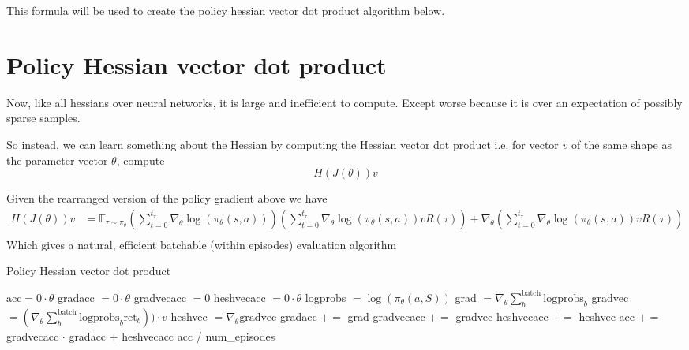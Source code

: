 \documentclass{article}
\theoremstyle{plain}
\theoremstyle{definition}
\theoremstyle{remark}
\begin{document}
	This formula will be used to create the policy hessian vector dot product algorithm below.
	
	\section{Policy Hessian vector dot product}
	Now, like all hessians over neural networks, it is large and inefficient to compute. Except worse because it is over an expectation of possibly sparse samples.
	
	So instead, we can learn something about the Hessian by computing the Hessian vector dot product i.e. for vector $v$ of the same shape as the parameter vector $\theta$, compute
	$$H(J(\theta))v$$
	
	Given the rearranged version of the policy gradient above we have
	$$
	\begin{aligned}
	H(J(\theta))v	&= \mathbb{E}_{\tau \sim \pi_\theta} \left(\sum_{t=0}^{t_\tau} \nabla_\theta \log(\pi_\theta(s,a))\right)\left(\sum_{t=0}^{t_\tau} \nabla_\theta \log(\pi_\theta(s,a))vR(\tau)\right)  + \nabla_\theta \left(\sum_{t=0}^{t_\tau} \nabla_\theta \log(\pi_\theta(s,a))vR(\tau)\right)  \\
	\end{aligned}
	$$
	Which gives a natural, efficient batchable (within episodes) evaluation algorithm
		
	\begin{algorithm}
		\caption{Policy Hessian vector dot product}
		\begin{algorithmic}[1]
			\State $\text{acc} = 0 \cdot \theta$
			\For{$\tau \sim \pi_\theta$}
				\State gradacc $= 0 \cdot \theta$
				\State gradvecacc $= 0$
				\State heshvecacc $= 0 \cdot \theta$
					\State logprobs $ = \log(\pi_\theta(a,S))$
					\State grad $ = \nabla_\theta \sum_b^\text{batch}\text{logprobs}_b$
					\State gradvec $ = (\nabla_\theta \sum_b^\text{batch} \text{logprobs}_b\text{ret}_b)) \cdot v$ 
					\State heshvec $ = \nabla_\theta \text{gradvec}$ 
					\State gradacc $+=$ grad 
					\State gradvecacc $+=$ gradvec
					\State heshvecacc $+=$ heshvec
				\EndFor{}
				\State acc $ +=$ gradvecacc $\cdot$ gradacc $ + $ heshvecacc
			\EndFor{}
			\Return acc / num\_episodes
			\EndProcedure
			
		\end{algorithmic}
	\end{algorithm}
\end{document}
